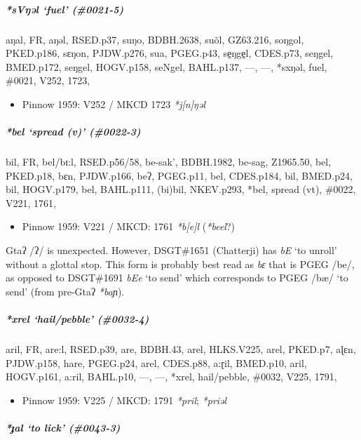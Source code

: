\documentclass[a4paper,]{article}
\providecommand{\tightlist}{%
  \setlength{\itemsep}{0pt}\setlength{\parskip}{0pt}}
\let\oldsubparagraph\subparagraph
\renewcommand{\subparagraph}[1]{\oldsubparagraph{#1}\mbox{}}
\begin{document}
\subparagraph{\texorpdfstring{\emph{*sVŋəl} `fuel'
(\#0021-5)}{*sVŋəl fuel (\#0021-5)}}\label{svux14bux259l-fuel-0021-5}

aŋal, FR, aŋəl, RSED.p37, suŋo, BDBH.2638, suõl, GZ63.216, soŋgol,
PKED.p186, sɛŋon, PJDW.p276, sua, PGEG.p43, se̠ŋge̠l, CDES.p73, seŋgel,
BMED.p172, seŋgel, HOGV.p158, seNgel, BAHL.p137, ---, ---, *sxŋəl, fuel,
\#0021, V252, 1723,

\begin{itemize}
\tightlist
\item
  Pinnow 1959: V252 / MKCD 1723 \emph{*j{[}n{]}ŋəl}
\end{itemize}

\subparagraph{\texorpdfstring{\emph{*bel} `spread (v)'
(\#0022-3)}{*bel spread (v) (\#0022-3)}}\label{bel-spread-v-0022-3}

bil, FR, bel/bɪ:l, RSED.p56/58, be-sak', BDBH.1982, be-sag, Z1965.50,
bel, PKED.p18, bɛn, PJDW.p166, beʔ, PGEG.p11, bel, CDES.p184, bil,
BMED.p24, bil, HOGV.p179, bel, BAHL.p111, (bi)bil, NKEV.p293, *bel,
spread (vt), \#0022, V221, 1761,

\begin{itemize}
\tightlist
\item
  Pinnow 1959: V221 / MKCD: 1761 \emph{*b{[}e{]}l} (\emph{*beel}?)
\end{itemize}

Gtaʔ /ʔ/ is unexpected. However, DSGT\#1651 (Chatterji) has \emph{bE}
`to unroll' without a glottal stop. This form is probably best read as
\emph{bɛ} that is PGEG /be/, as opposed to DSGT\#1691 \emph{bEe} `to
send' which corresponds to PGEG /bæ/ `to send' (from pre-Gtaʔ
\emph{*baɲ}).

\subparagraph{\texorpdfstring{\emph{*xrel} `hail/pebble'
(\#0032-4)}{*xrel hail/pebble (\#0032-4)}}\label{xrel-hailpebble-0032-4}

aril, FR, are:l, RSED.p39, are, BDBH.43, arel, HLKS.V225, arel, PKED.p7,
aɭɛn, PJDW.p158, hare, PGEG.p24, arel, CDES.p88, a:ɽil, BMED.p10, aril,
HOGV.p161, a:ril, BAHL.p10, ---, ---, *xrel, hail/pebble, \#0032, V225,
1791,

\begin{itemize}
\tightlist
\item
  Pinnow 1959: V225 / MKCD: 1791 \emph{*pril}; \emph{*priəl}
\end{itemize}

\subparagraph{\texorpdfstring{\emph{*ɟal} `to lick'
(\#0043-3)}{*ɟal to lick (\#0043-3)}}\label{ux25fal-to-lick-0043-3}
\end{document}
